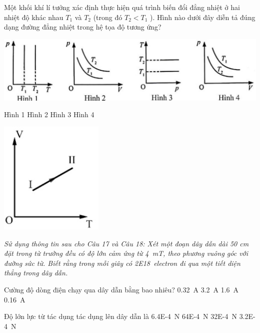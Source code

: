 \begin{ex}
	Một khối khí lí tưởng xác định thực hiện quá trình biến đổi đẳng nhiệt ở hai nhiệt độ khác nhau $T_1$ và $T_2$ (trong đó $T_2<T_1$ ). Hình nào dưới đây diễn tả đúng dạng đường đẳng nhiệt trong hệ tọa độ tương ứng?
	\begin{center}
		\includegraphics[scale=0.7]{../figs/FINAL-SEM1-004-4}
	\end{center}
	\choice
	{Hình 1}
	{Hình 2}
	{Hình 3}
	{\True Hình 4}
	\loigiai{}
\end{ex}
\begin{ex}
		{\vspace{-0.5cm}\includegraphics[scale=0.8]{../figs/FINAL-SEM1-004-5}}
\end{ex}
\textit{Sử dụng thông tin sau cho Câu 17 và Câu 18: Xét một đoạn dây dẫn dài 50 cm đặt trong từ trường đều có độ lớn cảm ứng từ \SI{4}{\milli\tesla}, theo phương vuông góc với đường sức từ. Biết rằng trong mỗi giây có \SI{2E18}{electron} đi qua một tiết diện thẳng trong dây dẫn.}
\begin{ex}
	Cường độ dòng điện chạy qua dây dẫn bằng bao nhiêu?
	\choice
	{\True \SI{0.32}{\ampere}}
	{\SI{3.2}{\ampere}}
	{\SI{1.6}{\ampere}}
	{\SI{0.16}{\ampere}}
\end{ex}
\begin{ex}
	Độ lớn lực từ tác dụng tác dụng lên dây dẫn là
	\choice
	{\True \SI{6.4E-4}{\newton}}
	{\SI{64E-4}{\newton}}
	{\SI{32E-4}{\newton}}
	{\SI{3.2E-4}{\newton}}
\end{ex}

